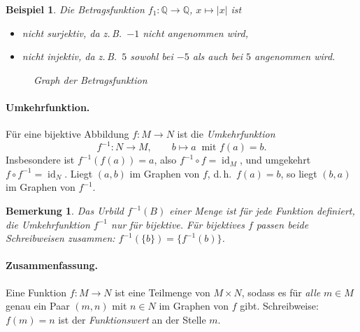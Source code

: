 \documentclass[a4paper]{article}
\theoremstyle{kurzskript}
\newtheorem*{bsp}{Beispiel}
\newtheorem*{bem}{Bemerkung}
\newcommand{\Q}{\mathbb{Q}}
\begin{document}
\begin{bsp}
Die Betragsfunktion $f_1\colon \Q \to \Q$, $x \mapsto |x|$ ist
\begin{itemize}
  \item nicht surjektiv, da z.\,B.\ $-1$ nicht angenommen wird,
  \item nicht injektiv, da z.\,B.\ $5$ sowohl bei $-5$ als auch bei $5$ angenommen wird.
\end{itemize}
\begin{figure}[H]
\centering
{}
\caption{Graph der Betragsfunktion}
\end{figure}
\end{bsp}

\paragraph{Umkehrfunktion.}
Für eine bijektive Abbildung $f\colon M \to N$ ist die \emph{Umkehrfunktion}
\[
  f^{-1}\colon N \to M, \qquad b \mapsto a \ \text{ mit } f(a) = b.
\]
Insbesondere ist $f^{-1}(f(a)) = a$, also $f^{-1} \circ f = \operatorname{id}_M$, und umgekehrt $f \circ f^{-1} = \operatorname{id}_N$. Liegt $(a, b)$ im Graphen von $f$, d.\,h.\ $f(a) = b$, so liegt $(b, a)$ im Graphen von $f^{-1}$.

\begin{bem}
Das Urbild $f^{-1}(B)$ einer Menge ist für \emph{jede} Funktion definiert, die Umkehrfunktion $f^{-1}$ nur für bijektive. Für bijektives $f$ passen beide Schreibweisen zusammen: $f^{-1}(\{b\}) = \{f^{-1}(b)\}$.
\end{bem}

\paragraph{Zusammenfassung.}
Eine Funktion $f\colon M \to N$ ist eine Teilmenge von $M \times N$, sodass es für \emph{alle} $m \in M$ genau ein Paar $(m, n)$ mit $n \in N$ im Graphen von $f$ gibt. Schreibweise: $f(m) = n$ ist der \emph{Funktionswert} an der Stelle $m$.
\end{document}
